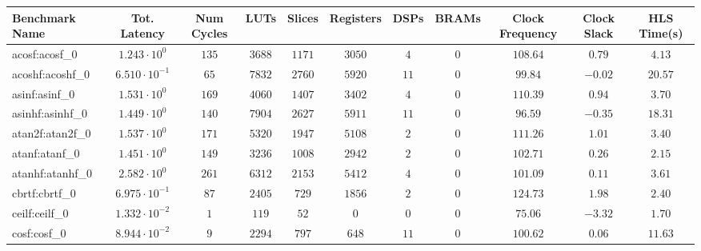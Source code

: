 \begin{tabular}{|l|c|c|c|c|c|c|c|c|c|c|}
\hline
Benchmark Name               & Tot. Latency            & Num Cycles & LUTs       & Slices    & Registers & DSPs    & BRAMs & Clock Frequency & Clock Slack & HLS Time(s) \\
\hline
acosf:acosf\_0               & $ 1.243 \cdot 10^{0}  $ & $ 135    $ & $ 3688   $ & $ 1171  $ & $ 3050  $ & $ 4   $ & $ 0 $ & $ 108.64      $ & $ 0.79    $ & $ 4.13    $ \\
acoshf:acoshf\_0             & $ 6.510 \cdot 10^{-1} $ & $ 65     $ & $ 7832   $ & $ 2760  $ & $ 5920  $ & $ 11  $ & $ 0 $ & $ 99.84       $ & $ -0.02   $ & $ 20.57   $ \\
asinf:asinf\_0               & $ 1.531 \cdot 10^{0}  $ & $ 169    $ & $ 4060   $ & $ 1407  $ & $ 3402  $ & $ 4   $ & $ 0 $ & $ 110.39      $ & $ 0.94    $ & $ 3.70    $ \\
asinhf:asinhf\_0             & $ 1.449 \cdot 10^{0}  $ & $ 140    $ & $ 7904   $ & $ 2627  $ & $ 5911  $ & $ 11  $ & $ 0 $ & $ 96.59       $ & $ -0.35   $ & $ 18.31   $ \\
atan2f:atan2f\_0             & $ 1.537 \cdot 10^{0}  $ & $ 171    $ & $ 5320   $ & $ 1947  $ & $ 5108  $ & $ 2   $ & $ 0 $ & $ 111.26      $ & $ 1.01    $ & $ 3.40    $ \\
atanf:atanf\_0               & $ 1.451 \cdot 10^{0}  $ & $ 149    $ & $ 3236   $ & $ 1008  $ & $ 2942  $ & $ 2   $ & $ 0 $ & $ 102.71      $ & $ 0.26    $ & $ 2.15    $ \\
atanhf:atanhf\_0             & $ 2.582 \cdot 10^{0}  $ & $ 261    $ & $ 6312   $ & $ 2153  $ & $ 5412  $ & $ 4   $ & $ 0 $ & $ 101.09      $ & $ 0.11    $ & $ 3.61    $ \\
cbrtf:cbrtf\_0               & $ 6.975 \cdot 10^{-1} $ & $ 87     $ & $ 2405   $ & $ 729   $ & $ 1856  $ & $ 2   $ & $ 0 $ & $ 124.73      $ & $ 1.98    $ & $ 2.40    $ \\
ceilf:ceilf\_0               & $ 1.332 \cdot 10^{-2} $ & $ 1      $ & $ 119    $ & $ 52    $ & $ 0     $ & $ 0   $ & $ 0 $ & $ 75.06       $ & $ -3.32   $ & $ 1.70    $ \\
cosf:cosf\_0                 & $ 8.944 \cdot 10^{-2} $ & $ 9      $ & $ 2294   $ & $ 797   $ & $ 648   $ & $ 11  $ & $ 0 $ & $ 100.62      $ & $ 0.06    $ & $ 11.63   $ \\

\end{tabular}
